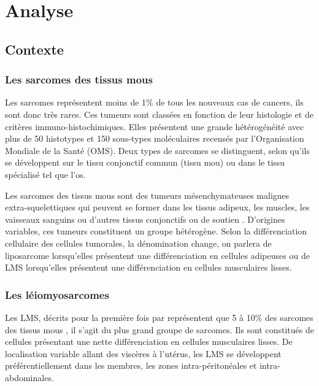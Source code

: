 \chapter{Analyse}\label{chap:analyse}

\section{Contexte}\label{sec:départ}

\subsection{Les sarcomes des tissus mous}\label{subsec:sarcomes}

Les sarcomes représentent moins de 1\% de tous les nouveaux cas de cancers, ils sont donc très rares. Ces tumeurs sont classées en fonction de leur histologie et de critères immuno-histochimiques.
Elles présentent une grande hétérogénéité avec plus de 50 histotypes et 150 sous-types moléculaires recensés par l’Organisation Mondiale de la Santé (OMS). Deux types de sarcomes se distinguent, selon qu’ils se développent sur le tissu conjonctif commun (tissu mou) ou dans le tissu spécialisé tel que l’os. 

Les sarcomes des tissus mous sont des tumeurs mésenchymateuses malignes extra-squelettiques qui peuvent se former dans les tissus adipeux, les muscles, les vaisseaux sanguins ou d'autres tissus conjonctifs ou de soutien \citep{Sarcoma}. D'origines variables, ces tumeurs constituent un groupe hétérogène. Selon la différenciation cellulaire des cellules tumorales, la dénomination change, on parlera de liposarcome lorsqu'elles présentent une différenciation en cellules adipeuses ou de LMS lorsqu'elles présentent une différenciation en cellules musculaires lisses.

\subsection{Les léiomyosarcomes}\label{subsec:LMS}

Les LMS, décrits pour la première fois par \citet{LMS} représentent que 5 à 10\% des sarcomes des tissus mous \citep{Voulalas}, il s'agit du plus grand groupe de sarcomes. Ils sont constitués de cellules présentant une nette différenciation en cellules musculaires lisses. De localisation variable allant des viscères à l’utérus, les LMS se développent préférentiellement dans les membres, les zones intra-péritonéales et intra-abdominales.

